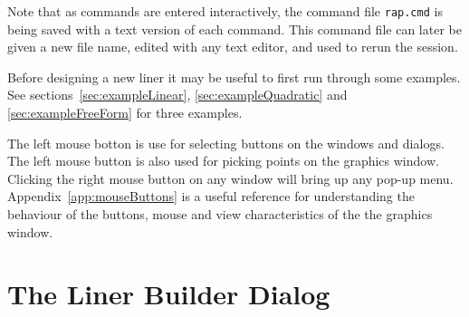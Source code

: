 \documentclass[12pt]{article}
\begin{document}
Note that as commands are entered interactively, the command file {\tt rap.cmd} is
being saved with a text version of each command. This command file can later be given
a new file name, edited with any text editor, and used to rerun the session. 

Before designing a new liner it may be useful to first run through some examples.
See sections~\ref{sec:exampleLinear}, \ref{sec:exampleQuadratic} and \ref{sec:exampleFreeForm} for 
three examples. 

The left mouse botton is use for selecting buttons on the windows and dialogs.
The left mouse button is also used for picking points on the graphics window. Clicking the right
mouse button on any window will bring up any pop-up menu.
Appendix~\ref{app:mouseButtons} is a useful reference for understanding the behaviour of
the buttons, mouse and view characteristics of the the graphics window.











\clearpage
\section{The Liner Builder Dialog}
\end{document}
